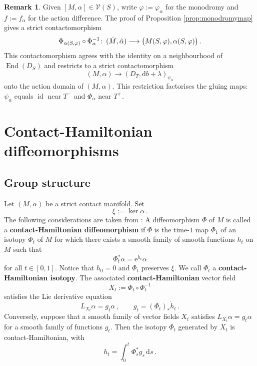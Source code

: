 \documentclass{amsart}
\theoremstyle{definition}
\newtheorem{rem}[prop]{Remark}
\def\co{\colon\thinspace}
\newcommand{\rmd}{\mathrm d}
\newcommand{\rme}{\mathrm e}
\newcommand{\VV}{\mathcal V}
\newcommand{\lra}{\longrightarrow}
\DeclareMathOperator{\End}{\mathrm{End}}
\DeclareMathOperator{\id}{\mathrm{id}}
\begin{document}
 
\begin{rem}
  Given $[M,\alpha]\in\VV(S)$,
  write $\varphi:=\varphi_{\alpha}$ for the monodromy
  and $f:=f_{\alpha}$ for the action difference.
  The proof of Proposition \ref{prop:monodromymap}
  gives a strict contactomorphism
  \[
    \Phi_{\alpha(S,\varphi)}\circ\Phi_{\alpha}^{-1}\co
    (\hat{M},\hat{\alpha})
    \lra
    \big(M(S,\varphi),\alpha(S,\varphi)\big)
    \,.
  \]
  This contactomorphism agrees with the identity
  on a neighbourhood of $\End(D_S)$
  and restricts to a strict contactomorphism
  \[
    (M,\alpha)
    \lra
    (D_T,\rmd b+\lambda)_{\psi_{\alpha}}
  \]
  onto the action domain of $(M,\alpha)$.
  This restriction factorises the gluing maps:
  $\psi_{\alpha}$ equals $\id$ near $T^-$
  and $\Phi_{\alpha}$ near $T^+$.
\end{rem}




\section{Contact-Hamiltonian diffeomorphisms}
\label{sec:conthamdiff}



\subsection{Group structure}
\label{subsec:groupstructure}


Let $(M,\alpha)$ be a strict contact manifold.
Set
\[
\xi:=\ker\alpha
\,.
\]
The following considerations are taken from
\cite[Section~2.3]{gei08}:
A diffeomorphism $\Phi$ of $M$
is called a {\bf contact-Hamiltonian diffeomorphism}
if $\Phi$ is the time-$1$ map $\Phi_1$
of an isotopy $\Phi_t$ of $M$ for which
there exists a smooth family of smooth functions
$h_t$ on $M$ such that
\[
\Phi_t^*\alpha=\rme^{h_t}\alpha
\]
for all $t\in[0,1]$.
Notice that $h_0=0$ and $\Phi_t$ preserves $\xi$.
We call $\Phi_t$ a {\bf contact-Hamiltonian isotopy}.
The associated {\bf contact-Hamiltonian} vector field
\[
X_t:=\dot{\Phi}_t\circ\Phi_t^{-1}
\]
satisfies the Lie derivative equation
\[
L_{X_t}\alpha=g_t\alpha
\,,
\qquad
g_t=(\Phi_t)_*\dot{h}_t
\,.
\]
Conversely, suppose that a smooth family of vector fields
$X_t$ satisfies $L_{X_t}\alpha=g_t\alpha$
for a smooth family of functions $g_t$.
Then the isotopy $\Phi_t$ generated by $X_t$
is contact-Hamiltonian, with
\[
h_t=\int_0^t\Phi_s^*g_s\,\rmd s
\,.
\]
\end{document}
